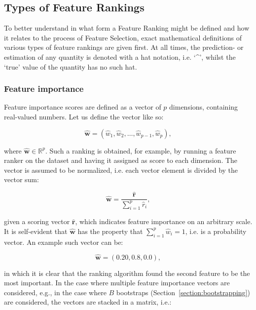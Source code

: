 \documentclass{article}
\begin{document}
\subsection{Types of Feature Rankings}\label{section:types of feature rankings}
To better understand in what form a Feature Ranking might be defined and how it relates to the process of Feature Selection, exact mathematical definitions of various types of feature rankings are given first. At all times, the prediction- or estimation of any quantity is denoted with a hat notation, i.e. `\textasciicircum', whilst the `true' value of the quantity has no such hat.

\subsubsection{Feature importance}\label{section:feature-importance-definition}
Feature importance scores are defined as a vector of $p$ dimensions, containing real-valued numbers. Let us define the vector like so:

\begin{equation}
\hat{\boldsymbol{w}} = (\hat{w}_1, \hat{w}_2, \ldots, \hat{w}_{p-1}, \hat{w}_p),
\end{equation}

where $\hat{\boldsymbol{w}} \in \mathbb{R}^p$. Such a ranking is obtained, for example, by running a feature ranker on the dataset and having it assigned as score to each dimension. The vector is assumed to be normalized, i.e. each vector element is divided by the vector sum:

\begin{equation}\label{eq:normalize-feature-ranking}
\hat{\boldsymbol{w}} = \frac{\hat{\boldsymbol{r}}}{\sum^p_{i=1} \hat{r}_i},
\end{equation}

given a scoring vector $\hat{\boldsymbol{r}}$, which indicates feature importance on an arbitrary scale. It is self-evident that $\hat{\boldsymbol{w}}$ has the property that $\sum^p_{i=1} \hat{w}_i = 1$, i.e. is a probability vector. An example such vector can be:

\begin{equation}\label{eq:importance-vector-example}
\hat{\boldsymbol{w}} = (0.20, 0.8, 0.0),
\end{equation}

in which it is clear that the ranking algorithm found the second feature to be the most important. In the case where multiple feature importance vectors are considered, e.g., in the case where $B$ bootstraps (Section~\ref{section:bootstrapping}) are considered, the vectors are stacked in a matrix, i.e.:
\end{document}

